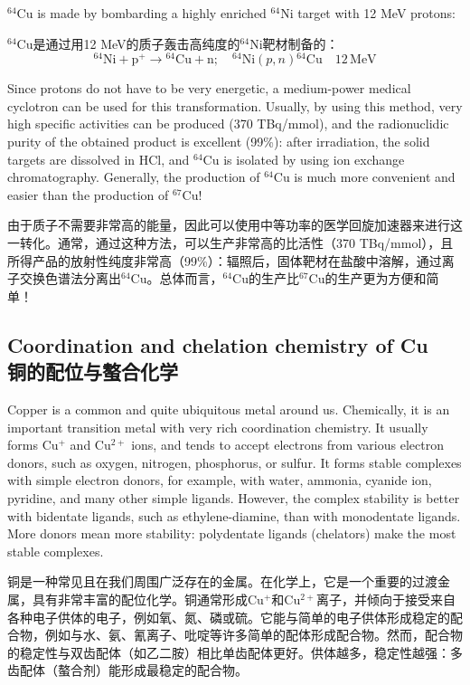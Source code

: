 \documentclass[dvipsnames, svgnames,a4paper,11pt]{article}
\begin{document}
\(\mathrm{^{64}Cu}\) is made by bombarding a highly enriched \(\mathrm{^{64}Ni}\) target with 12 MeV protons:  

\(\mathrm{^{64}Cu}\)是通过用12 MeV的质子轰击高纯度的\(\mathrm{^{64}Ni}\)靶材制备的：  
\[
\mathrm{^{64}Ni} + \mathrm{p^+} \rightarrow \mathrm{^{64}Cu} + \mathrm{n}; \quad \mathrm{^{64}Ni}(p, n)\mathrm{^{64}Cu} \quad 12 \, \mathrm{MeV}
\]

Since protons do not have to be very energetic, a medium-power medical cyclotron can be used for this transformation. Usually, by using this method, very high specific activities can be produced (370 TBq/mmol), and the radionuclidic purity of the obtained product is excellent (99\%): after irradiation, the solid targets are dissolved in HCl, and \(\mathrm{^{64}Cu}\) is isolated by using ion exchange chromatography. Generally, the production of \(\mathrm{^{64}Cu}\) is much more convenient and easier than the production of \(\mathrm{^{67}Cu}\)!

由于质子不需要非常高的能量，因此可以使用中等功率的医学回旋加速器来进行这一转化。通常，通过这种方法，可以生产非常高的比活性（370 TBq/mmol），且所得产品的放射性纯度非常高（99\%）：辐照后，固体靶材在盐酸中溶解，通过离子交换色谱法分离出\(\mathrm{^{64}Cu}\)。总体而言，\(\mathrm{^{64}Cu}\)的生产比\(\mathrm{^{67}Cu}\)的生产更为方便和简单！

\subsection{Coordination and chelation chemistry of Cu\\ 铜的配位与螯合化学}  
Copper is a common and quite ubiquitous metal around us. Chemically, it is an important transition metal with very rich coordination chemistry. It usually forms \(\mathrm{Cu^+}\) and \(\mathrm{Cu^{2+}}\) ions, and tends to accept electrons from various electron donors, such as oxygen, nitrogen, phosphorus, or sulfur. It forms stable complexes with simple electron donors, for example, with water, ammonia, cyanide ion, pyridine, and many other simple ligands. However, the complex stability is better with bidentate ligands, such as ethylene-diamine, than with monodentate ligands. More donors mean more stability: polydentate ligands (chelators) make the most stable complexes.

铜是一种常见且在我们周围广泛存在的金属。在化学上，它是一个重要的过渡金属，具有非常丰富的配位化学。铜通常形成\(\mathrm{Cu^+}\)和\(\mathrm{Cu^{2+}}\)离子，并倾向于接受来自各种电子供体的电子，例如氧、氮、磷或硫。它能与简单的电子供体形成稳定的配合物，例如与水、氨、氰离子、吡啶等许多简单的配体形成配合物。然而，配合物的稳定性与双齿配体（如乙二胺）相比单齿配体更好。供体越多，稳定性越强：多齿配体（螯合剂）能形成最稳定的配合物。
\end{document}
